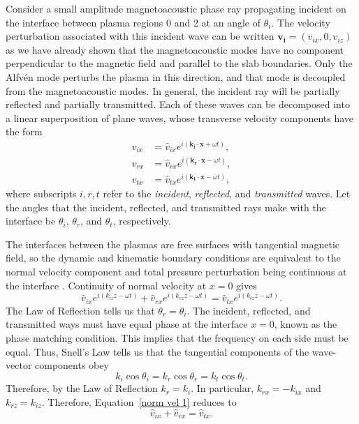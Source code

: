 \documentclass[12pt]{../style-files/ociamthesis}
\begin{document}
	Consider a small amplitude magnetoacoustic phase ray propagating incident on the interface between plasma regions 0 and 2 at an angle of $\theta_i$. The velocity perturbation associated with this incident wave can be written $\mathbf{v_i} = (v_{ix}, 0, v_{iz})$ as we have already shown that the magnetoacoustic modes have no component perpendicular to the magnetic field and parallel to the slab boundaries. Only the Alfv\'{e}n mode perturbs the plasma in this direction, and that mode is decoupled from the magnetoacoustic modes. In general, the incident ray will be partially reflected and partially transmitted. Each of these waves can be decomposed into a linear superposition of plane waves, whose transverse velocity components have the form
	\begin{align}
	v_{ix} &= \hat{v}_{ix} e^{i(\mathbf{k_i}\cdot \mathbf{x} + \omega t)}, \\
	v_{rx} &= \hat{v}_{rx} e^{i(\mathbf{k_r}\cdot \mathbf{x} - \omega t)}, \\
	v_{tx} &= \hat{v}_{tx} e^{i(\mathbf{k_t}\cdot \mathbf{x} - \omega t)},
	\label{fourier}
	\end{align}
	where subscripts $i, r, t$ refer to the \textit{incident}, \textit{reflected}, and \textit{transmitted} waves. Let the angles that the incident, reflected, and transmitted rays make with the interface be $\theta_i$, $\theta_r$, and $\theta_t$, respectively.
	
	The interfaces between the plasmas are free surfaces with tangential magnetic field, so the dynamic and kinematic boundary conditions are equivalent to the normal velocity component and total pressure perturbation being continuous at the interface \citep{goe_etal04}. Continuity of normal velocity at $x = 0$ gives
	\begin{equation}
	\hat{v}_{ix}e^{i(k_{iz}z - \omega t)} + \hat{v}_{rx}e^{i(k_{rz}z - \omega t)} = \hat{v}_{tx}e^{i(k_{tz}z - \omega t)}. \label{norm vel 1}
	\end{equation}
	The Law of Reflection tells us that $\theta_r = \theta_i$. The incident, reflected, and transmitted ways must have equal phase at the interface $x = 0$, known as the phase matching condition. This implies that the frequency on each side must be equal. Thus, Snell's Law tells us that the tangential components of the wave-vector components obey
	\begin{equation}
	k_i\cos{\theta_i} = k_r\cos{\theta_r} = k_t\cos{\theta_t}. \label{tang comp}
	\end{equation}
	Therefore, by the Law of Reflection $k_r = k_i$. In particular, $k_{rx} = -k_{ix}$ and $k_{rz} = k_{iz}$. Therefore, Equation~\eqref{norm vel 1} reduces to
	\begin{equation}
	\hat{v}_{ix} + \hat{v}_{rx} = \hat{v}_{tx}. \label{cont vel}
	\end{equation}
	
\end{document}
